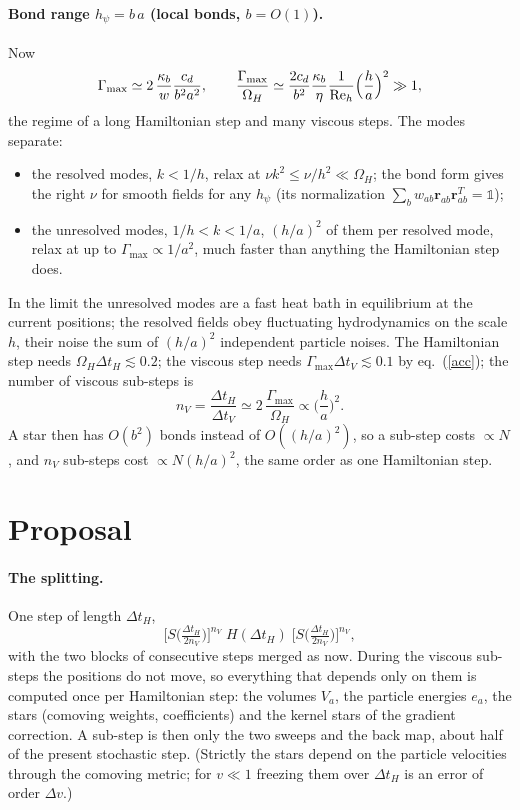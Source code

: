 \documentclass[11pt,aps,preprint,nofootinbib,superscriptaddress,tightenlines]{revtex4-2}
\newcommand{\one}{\mathds{1}}
\def\st{\begin{equation}}
\def\stp{\end{equation}}
\def\Eq#1{eq.~(\ref{#1})}
\let\oldparagraph\paragraph
\renewcommand{\paragraph}{\par\bigskip\oldparagraph}
\begin{document}
\paragraph{Bond range $h_\psi=b\,a$ (local bonds, $b=O(1)$).}  Now
\st
\Gamma_{\max}\simeq2\,\frac{\kappa_b}{w}\frac{c_d}{b^2a^2},\qquad
\frac{\Gamma_{\max}}{\Omega_H}\simeq\frac{2c_d}{b^2}\frac{\kappa_b}{\eta}\frac{1}{{\rm Re}_h}\Big(\frac ha\Big)^2\gg1 ,
\label{local}
\stp
the regime of a long Hamiltonian step and many viscous steps.  The modes separate:
\begin{itemize}
\item the resolved modes, $k<1/h$, relax at $\nu k^2\le\nu/h^2\ll\Omega_H$; the bond form gives
  the right $\nu$ for smooth fields for any $h_\psi$ (its normalization
  $\sum_bw_{ab}\bm r_{ab}\bm r_{ab}^T=\one$);
\item the unresolved modes, $1/h<k<1/a$, $(h/a)^2$ of them per resolved mode, relax at up to
  $\Gamma_{\max}\propto1/a^2$, much faster than anything the Hamiltonian step does.
\end{itemize}
In the limit the unresolved modes are a fast heat bath in equilibrium at the
current positions; the resolved fields obey fluctuating hydrodynamics on the
scale $h$, their noise the sum of $(h/a)^2$ independent particle noises.  The
Hamiltonian step needs $\Omega_H\Delta t_H\lesssim0.2$; the viscous step needs
$\Gamma_{\max}\Delta t_V\lesssim0.1$ by \Eq{acc}; the number of viscous sub-steps is
\st
n_V=\frac{\Delta t_H}{\Delta t_V}\simeq2\,\frac{\Gamma_{\max}}{\Omega_H}\propto\Big(\frac ha\Big)^2 .
\stp
A star then has $O(b^2)$ bonds instead of $O((h/a)^2)$, so a sub-step costs
$\propto N$, and $n_V$ sub-steps cost $\propto N(h/a)^2$, the same order as one Hamiltonian step.

\section{Proposal}
\label{sec:proposal}

\paragraph{The splitting.}  One step of length $\Delta t_H$,
\st
\Big[S\big(\tfrac{\Delta t_H}{2n_V}\big)\Big]^{n_V}\;H(\Delta t_H)\;\Big[S\big(\tfrac{\Delta t_H}{2n_V}\big)\Big]^{n_V},
\label{split}
\stp
with the two blocks of consecutive steps merged as now.  During the viscous
sub-steps the positions do not move, so everything that depends only on them is
computed once per Hamiltonian step: the volumes $V_a$, the particle energies $e_a$,
the stars (comoving weights, coefficients) and the kernel stars of the gradient
correction.  A sub-step is then only the two sweeps and the back map, about half
of the present stochastic step.  (Strictly the stars depend on the particle
velocities through the comoving metric; for $v\ll1$ freezing them over $\Delta t_H$ is
an error of order $\Delta v$.)
\end{document}
